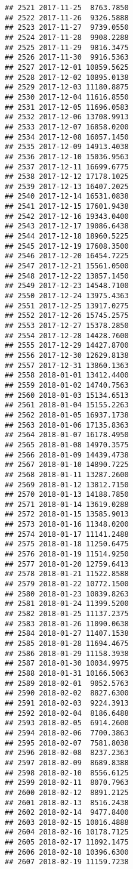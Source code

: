\documentclass[
]{article}
\begin{document}
\begin{verbatim}
## 2521 2017-11-25  8763.7850
## 2522 2017-11-26  9326.5888
## 2523 2017-11-27  9739.0550
## 2524 2017-11-28  9908.2288
## 2525 2017-11-29  9816.3475
## 2526 2017-11-30  9916.5363
## 2527 2017-12-01 10859.5625
## 2528 2017-12-02 10895.0138
## 2529 2017-12-03 11180.8875
## 2530 2017-12-04 11616.8550
## 2531 2017-12-05 11696.0583
## 2532 2017-12-06 13708.9913
## 2533 2017-12-07 16858.0200
## 2534 2017-12-08 16057.1450
## 2535 2017-12-09 14913.4038
## 2536 2017-12-10 15036.9563
## 2537 2017-12-11 16699.6775
## 2538 2017-12-12 17178.1025
## 2539 2017-12-13 16407.2025
## 2540 2017-12-14 16531.0838
## 2541 2017-12-15 17601.9438
## 2542 2017-12-16 19343.0400
## 2543 2017-12-17 19086.6438
## 2544 2017-12-18 18960.5225
## 2545 2017-12-19 17608.3500
## 2546 2017-12-20 16454.7225
## 2547 2017-12-21 15561.0500
## 2548 2017-12-22 13857.1450
## 2549 2017-12-23 14548.7100
## 2550 2017-12-24 13975.4363
## 2551 2017-12-25 13917.0275
## 2552 2017-12-26 15745.2575
## 2553 2017-12-27 15378.2850
## 2554 2017-12-28 14428.7600
## 2555 2017-12-29 14427.8700
## 2556 2017-12-30 12629.8138
## 2557 2017-12-31 13860.1363
## 2558 2018-01-01 13412.4400
## 2559 2018-01-02 14740.7563
## 2560 2018-01-03 15134.6513
## 2561 2018-01-04 15155.2263
## 2562 2018-01-05 16937.1738
## 2563 2018-01-06 17135.8363
## 2564 2018-01-07 16178.4950
## 2565 2018-01-08 14970.3575
## 2566 2018-01-09 14439.4738
## 2567 2018-01-10 14890.7225
## 2568 2018-01-11 13287.2600
## 2569 2018-01-12 13812.7150
## 2570 2018-01-13 14188.7850
## 2571 2018-01-14 13619.0288
## 2572 2018-01-15 13585.9013
## 2573 2018-01-16 11348.0200
## 2574 2018-01-17 11141.2488
## 2575 2018-01-18 11250.6475
## 2576 2018-01-19 11514.9250
## 2577 2018-01-20 12759.6413
## 2578 2018-01-21 11522.8588
## 2579 2018-01-22 10772.1500
## 2580 2018-01-23 10839.8263
## 2581 2018-01-24 11399.5200
## 2582 2018-01-25 11137.2375
## 2583 2018-01-26 11090.0638
## 2584 2018-01-27 11407.1538
## 2585 2018-01-28 11694.4675
## 2586 2018-01-29 11158.3938
## 2587 2018-01-30 10034.9975
## 2588 2018-01-31 10166.5063
## 2589 2018-02-01  9052.5763
## 2590 2018-02-02  8827.6300
## 2591 2018-02-03  9224.3913
## 2592 2018-02-04  8186.6488
## 2593 2018-02-05  6914.2600
## 2594 2018-02-06  7700.3863
## 2595 2018-02-07  7581.8038
## 2596 2018-02-08  8237.2363
## 2597 2018-02-09  8689.8388
## 2598 2018-02-10  8556.6125
## 2599 2018-02-11  8070.7963
## 2600 2018-02-12  8891.2125
## 2601 2018-02-13  8516.2438
## 2602 2018-02-14  9477.8400
## 2603 2018-02-15 10016.4888
## 2604 2018-02-16 10178.7125
## 2605 2018-02-17 11092.1475
## 2606 2018-02-18 10396.6300
## 2607 2018-02-19 11159.7238

\end{verbatim}
\end{document}
